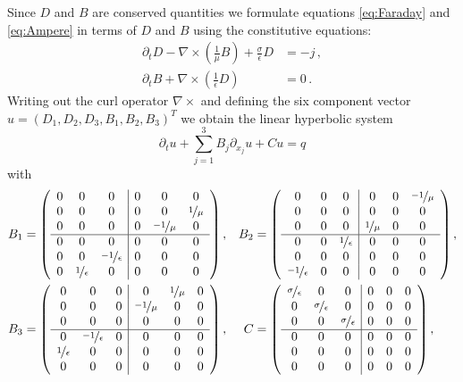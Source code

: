 \documentclass[a4paper,12pt]{article}
\theoremstyle{definition}
\theoremstyle{definition}
\begin{document}
Since $D$ and $B$ are conserved quantities we formulate equations \eqref{eq:Faraday} and
\eqref{eq:Ampere} in terms of $D$ and $B$ using the constitutive equations:
\begin{subequations}
\begin{align}
\partial_t D - \nabla\times\left(\frac{1}{\mu} B\right) + \frac{\sigma}{\epsilon} D &= - j\,,  \\
\partial_t B + \nabla\times\left( \frac{1}{\epsilon} D \right) &= 0\, .
\end{align}
\end{subequations}
Writing out the curl operator $\nabla\times$ and defining the six component
vector $u=(D_1,D_2,D_3,B_1,B_2,B_3)^T$ we obtain the linear hyperbolic system
\begin{equation}
\partial_t u + \sum_{j=1}^3 B_j \partial_{x_j} u + C u = q
\end{equation}
with
\begin{align*}
B_1 &= \left( \begin{array}{ccc|ccc}
0 & 0 & 0 & 0 & 0 & 0\\ 
0 & 0 & 0 & 0 & 0 & \nicefrac{1}{\mu}\\ 
0 & 0 & 0 & 0 & \nicefrac{-1}{\mu} & 0\\ 
\hline
0 & 0 & 0 & 0 & 0 & 0\\ 
0 & 0 & \nicefrac{-1}{\epsilon} & 0 & 0 & 0\\ 
0 & \nicefrac{1}{\epsilon} & 0 & 0 & 0 & 0
\end{array}
\right), &
B_2 &= \left( \begin{array}{ccc|ccc}
0 & 0 & 0 & 0 & 0 & \nicefrac{-1}{\mu}\\ 
0 & 0 & 0 & 0 & 0 & 0\\ 
0 & 0 & 0 & \nicefrac{1}{\mu} & 0 & 0\\ 
\hline
0 & 0 & \nicefrac{1}{\epsilon} & 0 & 0 & 0\\ 
0 & 0 & 0 & 0 & 0 & 0\\ 
\nicefrac{-1}{\epsilon} & 0 & 0 & 0 & 0 & 0
\end{array}
\right),\\
B_3 &= \left( \begin{array}{ccc|ccc}
0 & 0 & 0 & 0 & \nicefrac{1}{\mu} & 0\\ 
0 & 0 & 0 & \nicefrac{-1}{\mu} & 0 & 0\\ 
0 & 0 & 0 & 0 & 0 & 0\\ 
\hline
0 & \nicefrac{-1}{\epsilon} & 0 & 0 & 0 & 0\\ 
\nicefrac{1}{\epsilon} & 0 & 0 & 0 & 0 & 0\\ 
0 & 0 & 0 & 0 & 0 & 0
\end{array}
\right), &
C &= \left( \begin{array}{ccc|ccc}
\nicefrac{\sigma}{\epsilon} & 0 & 0 & 0 & 0 & 0\\ 
0 & \nicefrac{\sigma}{\epsilon} & 0 & 0 & 0 & 0\\ 
0 & 0 & \nicefrac{\sigma}{\epsilon} & 0 & 0 & 0\\ 
\hline
0 & 0 & 0 & 0 & 0 & 0\\ 
0 & 0 & 0 & 0 & 0 & 0\\ 
0 & 0 & 0 & 0 & 0 & 0
\end{array}
\right),
\end{align*}
\end{document}
